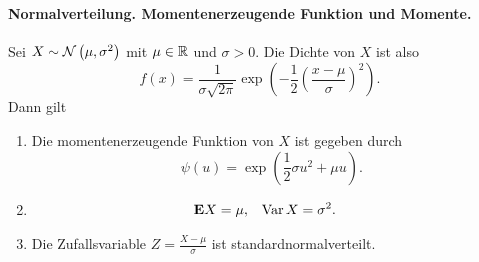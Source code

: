 \paragraph{Normalverteilung. Momentenerzeugende Funktion und Momente.}
Sei $X \sim \mathcal N \left( \mu, \sigma^{2} \right)$ mit $\mu\in\mathbb R$ und $\sigma>0$. 
Die Dichte von $X$ ist also
\begin{equation*}
    f(x) = \frac{1}{\sigma \sqrt{2\pi}}
    \exp \left( -\frac{1}{2} \left( \frac{x-\mu}{\sigma} \right)^2\right).
\end{equation*}
Dann gilt
\begin{enumerate}
    \item Die momentenerzeugende Funktion von $X$ ist gegeben durch 
        \begin{equation*}
            \psi(u) = \exp \left( \frac{1}{2} \sigma u^2 + \mu u \right).
        \end{equation*}
    \item 
        \begin{align*}
            \mathbf{E} X &= \mu, & \operatorname{Var} X &= \sigma^2.
        \end{align*}
    \item Die Zufallsvariable $Z = \frac{X-\mu}{\sigma}$ ist standardnormalverteilt.
\end{enumerate}
